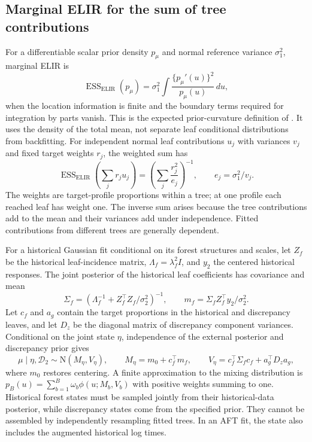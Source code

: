 \documentclass[11pt]{article}
\newcommand{\ESS}{\operatorname{ESS}}
\newcommand{\N}{\mathrm{N}}
\theoremstyle{remark}\newtheorem{remark}{Remark}[section]
\providecommand{\DIFaddtex}[1]{{\protect\color{blue} \sf #1}} %
\providecommand{\DIFaddbegin}{} %
\providecommand{\DIFadd}[1]{\texorpdfstring{\DIFaddtex{#1}}{#1}} %
\begin{document}
\DIFaddbegin \subsection{\DIFadd{Marginal ELIR for the sum of tree contributions}}\label{sec:B.9}
\DIFadd{For a differentiable scalar prior density $p_\mu$ and normal reference variance $\sigma_1^2$, marginal ELIR is
}\[
\ESS_{\mathrm{ELIR}}(p_\mu)
=\sigma_1^2\int\frac{\{p_\mu'(u)\}^2}{p_\mu(u)}\,du,
\]
\DIFadd{when the location information is finite and the boundary terms required for integration by parts vanish. This is the expected prior-curvature definition of \citet{neuenschwander2020}. It uses the density of the total mean, not separate leaf conditional distributions from backfitting. For independent normal leaf contributions $u_j$ with variances $v_j$ and fixed target weights $r_j$, the weighted sum has
}\[
\ESS_{\mathrm{ELIR}}\left(\sum_j r_j u_j\right)
=\left(\sum_j\frac{r_j^2}{e_j}\right)^{-1},\qquad e_j=\sigma_1^2/v_j.
\]
\DIFadd{The weights are target-profile proportions within a tree; at one profile each reached leaf has weight one. The inverse sum arises because the tree contributions add to the mean and their variances add under independence. Fitted contributions from different trees are generally dependent.
}

\DIFadd{For a historical Gaussian fit conditional on its forest structures and scales, let $Z_f$ be the historical leaf-incidence matrix, $\Lambda_f=\lambda_f^2 I$, and $y_2$ the centered historical responses. The joint posterior of the historical leaf coefficients has covariance and mean
}\[
\Sigma_f=(\Lambda_f^{-1}+Z_f^\top Z_f/\sigma_2^2)^{-1},\qquad
m_f=\Sigma_f Z_f^\top y_2/\sigma_2^2.
\]
\DIFadd{Let $c_f$ and $a_g$ contain the target proportions in the historical and discrepancy leaves, and let $D_z$ be the diagonal matrix of discrepancy component variances. Conditional on the joint state $\eta$, independence of the external posterior and discrepancy prior gives
}\[
\mu\mid\eta,\mathcal D_2\sim\N(M_\eta,V_\eta),\qquad
M_\eta=m_0+c_f^\top m_f,\qquad
V_\eta=c_f^\top\Sigma_f c_f+a_g^\top D_z a_g,
\]
\DIFadd{where $m_0$ restores centering. A finite approximation to the mixing distribution is $p_B(u)=\sum_{b=1}^B\omega_b\phi(u;M_b,V_b)$ with positive weights summing to one. Historical forest states must be sampled jointly from their historical-data posterior, while discrepancy states come from the specified prior. They cannot be assembled by independently resampling fitted trees. In an AFT fit, the state also includes the augmented historical log times.
}
\end{document}
